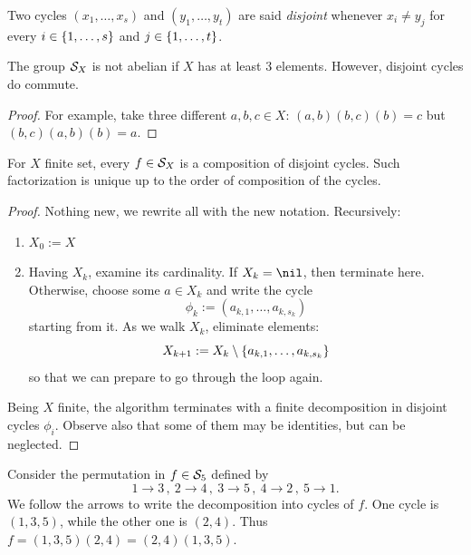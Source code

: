 Two cycles \(\left( x_1, \dots{}, x_s \right)\) and \(\left( y_1, \dots{}, y_t \right)\) are said {\em disjoint} whenever \(x_i \ne y_j\) for every \(i \in \left\{1, \dots{}, s\right\}\) and \(j \in \left\{1, \dots{}, t\right\}\).

\begin{proposition}
The group \(\mathcal S_X\) is not abelian if \(X\) has at least \(3\) elements. However, disjoint cycles do commute.
\end{proposition}

\begin{proof}
For example, take three different \(a, b, c \in X\): \((a, b) (b, c) (b) = c\) but \((b, c) (a, b) (b) = a\).
\end{proof}


\begin{proposition}\label{proposition:FactorInCycles}
For \(X\) finite set, every \(f \in \mathcal S_X\) is a composition of disjoint cycles. Such factorization is unique up to the order of composition of the cycles.
\end{proposition}

\begin{proof}
Nothing new, we rewrite all with the new notation. Recursively:
\begin{enumerate}
\item \(X_0 := X\)
\item Having \(X_k\), examine its cardinality. If \(X_k = \nil\), then terminate here. Otherwise, choose some \(a \in X_k\) and write the cycle
\[\phi_k := \left(a_{k, 1}, \dots{}, a_{k, s_k}\right)\]
starting from it. As we walk \(X_k\), eliminate elements:
\[X_{k+1} := X_k \setminus \left\{a_{k, 1}, \dots{}, a_{k, s_k}\right\}\]
so that we can prepare to go through the loop again.
\end{enumerate}
Being \(X\) finite, the algorithm terminates with a finite decomposition in disjoint cycles \(\phi_i\). Observe also that some of them may be identities, but can be neglected.
\end{proof}

\begin{example}
Consider the permutation in \(f \in \mathcal S_5\) defined by
\[1 \to 3 \,,\ 2 \to 4 \,,\ 3 \to 5 \,,\ 4 \to 2 \,,\ 5 \to 1 .\]
We follow the arrows to write the decomposition into cycles of \(f\). One cycle is \((1, 3, 5)\), while the other one is \((2, 4)\).
Thus \(f = (1, 3, 5)(2, 4) = (2, 4)(1, 3, 5)\). 
\end{example}

